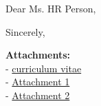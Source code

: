 \begin{coverletter}

    \displayCompanyAdress

    \vspace{10pt}

    \displaySubject%

    \vspace{10pt}

    Dear Ms. HR Person,

    \vspace{10pt}

    \lipsum[1-3]

    \vspace{10pt}

    Sincerely,
    \displaysignature

    \vfill
    \textbf{Attachments:}\\
    \-- \hyperref[cvPage.2]{curriculum vitae}\\
    \-- \hyperref[attachment.1]{Attachment 1}\\
    \-- \hyperref[attachment.2]{Attachment 2}


\end{coverletter}
